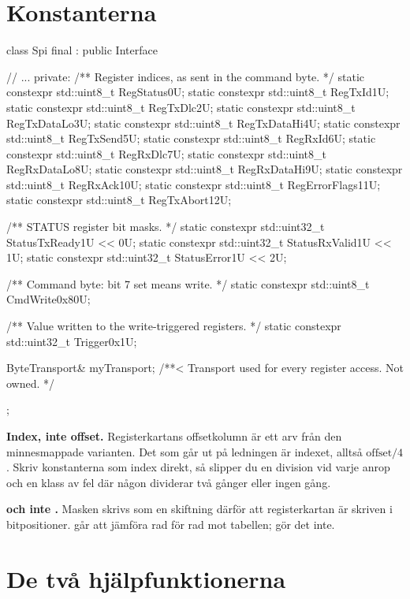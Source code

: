\section{Konstanterna}
\label{sec:constants}

\begin{cppcode}
class Spi final : public Interface
{
    // ...
private:
    /** Register indices, as sent in the command byte. */
    static constexpr std::uint8_t RegStatus{0U};
    static constexpr std::uint8_t RegTxId{1U};
    static constexpr std::uint8_t RegTxDlc{2U};
    static constexpr std::uint8_t RegTxDataLo{3U};
    static constexpr std::uint8_t RegTxDataHi{4U};
    static constexpr std::uint8_t RegTxSend{5U};
    static constexpr std::uint8_t RegRxId{6U};
    static constexpr std::uint8_t RegRxDlc{7U};
    static constexpr std::uint8_t RegRxDataLo{8U};
    static constexpr std::uint8_t RegRxDataHi{9U};
    static constexpr std::uint8_t RegRxAck{10U};
    static constexpr std::uint8_t RegErrorFlags{11U};
    static constexpr std::uint8_t RegTxAbort{12U};

    /** STATUS register bit masks. */
    static constexpr std::uint32_t StatusTxReady{1U << 0U};
    static constexpr std::uint32_t StatusRxValid{1U << 1U};
    static constexpr std::uint32_t StatusError{1U << 2U};

    /** Command byte: bit 7 set means write. */
    static constexpr std::uint8_t CmdWrite{0x80U};

    /** Value written to the write-triggered registers. */
    static constexpr std::uint32_t Trigger{0x1U};

    ByteTransport& myTransport; /**< Transport used for every register access. Not owned. */
};
\end{cppcode}

\textbf{Index, inte offset.} Registerkartans offsetkolumn är ett arv från den minnesmappade
varianten. Det som går ut på ledningen är indexet, alltså $\text{offset}/4$. Skriv konstanterna som
index direkt, så slipper du en division vid varje anrop och en klass av fel där någon dividerar
två gånger eller ingen gång.

\textbf{ och inte .} Masken skrivs som en skiftning därför att
registerkartan är skriven i bitpositioner.  går att jämföra rad för
rad mot tabellen;  gör det inte.

\section{De två hjälpfunktionerna}
\label{sec:helpers}

